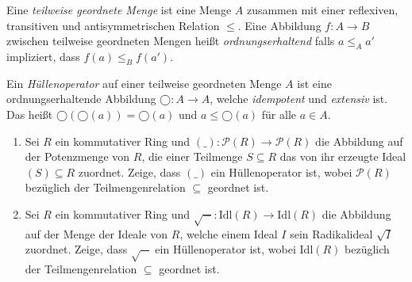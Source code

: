 \documentclass{latex-uebungsblatt/uebungsblatt}
\begin{document}

  Eine \emph{teilweise geordnete Menge} ist eine Menge $A$ zusammen mit einer reflexiven, transitiven und antisymmetrischen Relation $≤$.
  Eine Abbildung $f:A → B$ zwischen teilweise geordneten Mengen heißt \emph{ordnungserhaltend} falls $a ≤_A a'$ impliziert, dass $f(a) ≤_B f(a')$.

\begin{exercise}[Hüllenoperatoren]
  Ein \emph{Hüllenoperator} auf einer teilweise geordneten Menge $A$ ist eine ordnungserhaltende Abbildung $◯:A → A$, welche \emph{idempotent} und \emph{extensiv} ist.
  Das heißt $◯(◯(a))=◯(a)$ und $a ≤ ◯(a)$ für alle $a ∈ A$.
  \begin{enumerate}
    \item Sei $R$ ein kommutativer Ring und $(\_):𝒫(R) → 𝒫(R)$ die Abbildung auf der Potenzmenge von $R$, die einer Teilmenge $S⊆R$ das von ihr erzeugte Ideal $(S)⊆R$ zuordnet.
      Zeige, dass $(\_)$ ein Hüllenoperator ist, wobei $𝒫(R)$ bezüglich der Teilmengenrelation $⊆$ geordnet ist.
    \item Sei $R$ ein kommutativer Ring und $\sqrt{-}:\mathrm{Idl}(R) → \mathrm{Idl}(R)$ die Abbildung auf der Menge der Ideale von $R$, welche einem Ideal $I$ sein Radikalideal $\sqrt{I}$ zuordnet.
      Zeige, dass $\sqrt{-}$ ein Hüllenoperator ist, wobei $\mathrm{Idl}(R)$ bezüglich der Teilmengenrelation $⊆$ geordnet ist.
  \end{enumerate}
\end{exercise}
\end{document}
